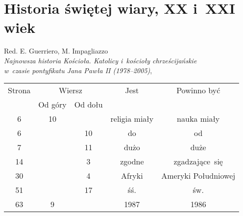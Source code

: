 \documentclass[a4paper,11pt]{article}
\begin{document}
\section{Historia świętej wiary, XX i~XXI wiek}



{ %
  Red. E. Guerriero, M. Impagliazzo \\
  \textit{Najnowsza historia Kościoła. Katolicy i~kościoły
    chrześcijańskie} \\
  \textit{w~czasie pontyfikatu Jana Pawła II (1978--2005)},
  \cite{GuerrieroImpagliazzoNajnowszaHistoriaKosciola2006} }

\vspace{0em}




\begin{center}

  \begin{tabular}{|c|c|c|c|c|}
    \hline
    Strona & \multicolumn{2}{c|}{Wiersz} & Jest
                              & Powinno być \\ \cline{2-3}
    & Od góry & Od dołu & & \\
    \hline
    \hphantom{0}6 & 10 & & religia miały & nauka miały \\
    \hphantom{0}6 & & 10 & do & od \\
    \hphantom{0}7 & & 11 & dużo & duże \\
    14 & & \hphantom{0}3 & zgodne & zgadzające~się \\
    30 & & \hphantom{0}4 & Afryki & Ameryki Południowej \\
    51 & & 17 & śś. & św. \\
    63 & \hphantom{0}9 & & 1987 & 1986 \\
    \hline
  \end{tabular}

\end{center}













\end{document}
